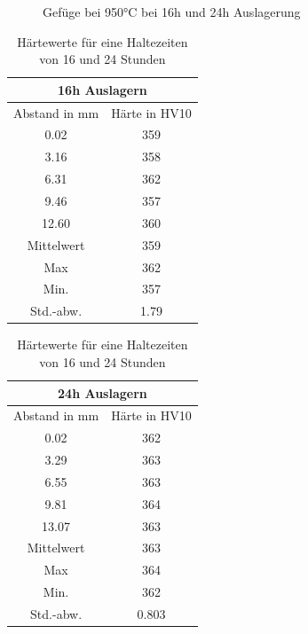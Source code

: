 \documentclass[a4paper, 11pt]{tubsreprt}
\begin{document}
\begin{figure}
	\caption{Gefüge bei 950°C bei 16h und 24h Auslagerung}
	\label{950 lange auslagerung}
\end{figure}

\begin{table}
\begin{tabular}{c|c}
\multicolumn{2}{c}{16h Auslagern} \\
\hline
Abstand in mm &	Härte in HV10 \\
0.02	&	359 \\
3.16	&	358 \\
6.31	&	362 \\
9.46	&	357 \\
12.60	&	360 \\
\hline
Mittelwert	&	359 \\
Max	&	362 \\
Min.	&	357 \\
Std.-abw.	&	1.79 \\
\end{tabular}
\begin{tabular}{c|c}
\multicolumn{2}{c}{24h Auslagern} \\
\hline
Abstand in mm	&	Härte in HV10 \\

0.02	&	362 \\
3.29	&	363 \\
6.55	&	363 \\
9.81	&	364 \\ 
13.07	&	363 \\
\hline
Mittelwert	&	363 \\
Max	&	364 \\
Min.	&	362 \\
Std.-abw.	&	0.803 \\
\end{tabular}
\caption{Härtewerte für eine Haltezeiten von 16 und 24 Stunden}
\label{950 16 24}
\end{table}
\end{document}
